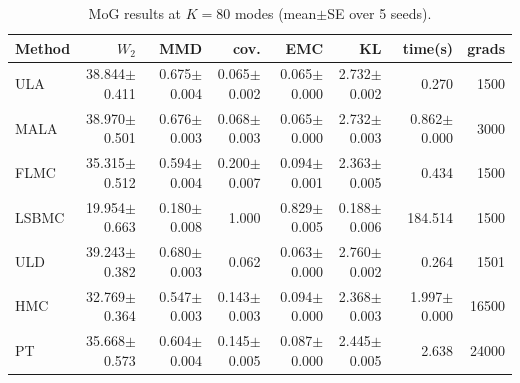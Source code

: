 \begin{table}[t]
\centering
\small
\caption{MoG results at $K=80$ modes (mean$\pm$SE over 5 seeds).}
\label{tab:mog_K80}
\begin{tabular}{lrrrrrrr}
\toprule
Method & $W_2$ & MMD & cov. & EMC & KL & time(s) & grads \\
\midrule
ULA & 38.844$\pm$0.411 & 0.675$\pm$0.004 & 0.065$\pm$0.002 & 0.065$\pm$0.000 & 2.732$\pm$0.002 & 0.270 & 1500 \\
MALA & 38.970$\pm$0.501 & 0.676$\pm$0.003 & 0.068$\pm$0.003 & 0.065$\pm$0.000 & 2.732$\pm$0.003 & 0.862$\pm$0.000 & 3000 \\
FLMC & 35.315$\pm$0.512 & 0.594$\pm$0.004 & 0.200$\pm$0.007 & 0.094$\pm$0.001 & 2.363$\pm$0.005 & 0.434 & 1500 \\
LSBMC & 19.954$\pm$0.663 & 0.180$\pm$0.008 & 1.000 & 0.829$\pm$0.005 & 0.188$\pm$0.006 & 184.514 & 1500 \\
ULD & 39.243$\pm$0.382 & 0.680$\pm$0.003 & 0.062 & 0.063$\pm$0.000 & 2.760$\pm$0.002 & 0.264 & 1501 \\
HMC & 32.769$\pm$0.364 & 0.547$\pm$0.003 & 0.143$\pm$0.003 & 0.094$\pm$0.000 & 2.368$\pm$0.003 & 1.997$\pm$0.000 & 16500 \\
PT & 35.668$\pm$0.573 & 0.604$\pm$0.004 & 0.145$\pm$0.005 & 0.087$\pm$0.000 & 2.445$\pm$0.005 & 2.638 & 24000 \\
\bottomrule
\end{tabular}
\end{table}